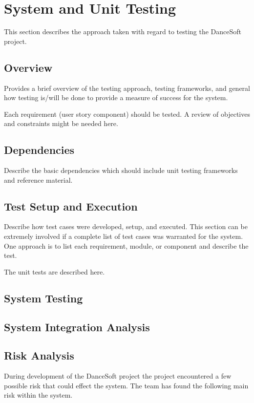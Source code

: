 

\chapter{System  and Unit Testing}

This section describes the approach taken with regard to testing the DanceSoft project. 

\section{Overview}
Provides a brief overview of the testing approach, testing frameworks, and general 
how testing is/will be done to provide a measure of success for the system.

Each requirement (user story component) should be tested.    A review of objectives and
constraints might be needed here.  

\section{Dependencies}
Describe the basic dependencies which should include unit testing frameworks and 
reference material. 


\section{Test Setup and Execution}
Describe how test cases were developed, setup, and executed.  This section can 
be extremely involved if a complete list of test cases was warranted for the system.   One 
approach is to list each requirement, module, or component and describe the test.

The unit tests are described here.

\section{System Testing}

\section{System Integration Analysis}

\section{Risk Analysis}
During development of the DanceSoft project the project encountered a few possible risk that could effect the system. The team has found the following main risk within the system.

